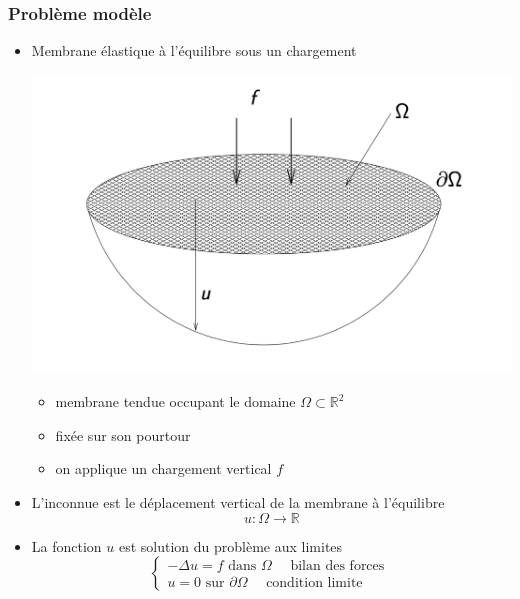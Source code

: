 \documentclass{beamer}
\begin{document}
\begin{frame}
\frametitle{Problème modèle}
\begin{itemize}
\item Membrane élastique à l'équilibre sous un chargement
\begin{center}
\includegraphics[scale=0.2]{membrane00.png} 
\end{center}
\begin{itemize}
\item membrane tendue occupant le domaine $\Omega\subset\mathbb{R}^2$
\item fixée sur son pourtour
\item on applique un chargement vertical $f$
\end{itemize}
\item L'inconnue est le déplacement vertical de la membrane à l'équilibre
\[u:\Omega \to \mathbb{R}\]
\item La fonction $u$ est solution du problème aux limites
\begin{equation}
\left\{
\begin{array}{l}
-\Delta u = f \mbox{ dans } \Omega \quad \mbox{ bilan des forces }\\
u=0  \mbox{ sur } \partial \Omega \quad \mbox{ condition limite }
\end{array}
\right.
\label{dirichletDim1}
\end{equation}
\end{itemize}

\end{frame}
\end{document}
